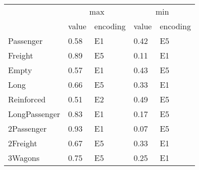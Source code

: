 \begin{tabular}{lllll}
\toprule
 & \multicolumn{2}{c}{max} & \multicolumn{2}{c}{min} \\
 & value & encoding & value & encoding \\
\midrule
Passenger & 0.58 & E1 & 0.42 & E5 \\
Freight & 0.89 & E5 & 0.11 & E1 \\
Empty & 0.57 & E1 & 0.43 & E5 \\
Long & 0.66 & E5 & 0.33 & E1 \\
Reinforced & 0.51 & E2 & 0.49 & E5 \\
LongPassenger & 0.83 & E1 & 0.17 & E5 \\
2Passenger & 0.93 & E1 & 0.07 & E5 \\
2Freight & 0.67 & E5 & 0.33 & E1 \\
3Wagons & 0.75 & E5 & 0.25 & E1 \\
\bottomrule
\end{tabular}
